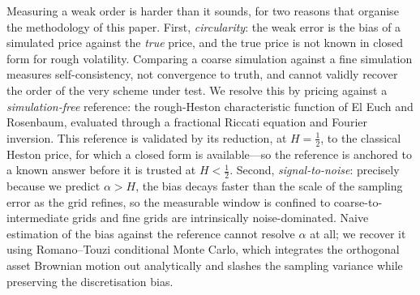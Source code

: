 \documentclass[11pt]{article}
\theoremstyle{plain}
\theoremstyle{definition}
\begin{document}
Measuring a weak order is harder than it sounds, for two reasons that organise the
methodology of this paper. First, \emph{circularity}: the weak error is the bias of
a simulated price against the \emph{true} price, and the true price is not known in
closed form for rough volatility. Comparing a coarse simulation against a fine
simulation measures self-consistency, not convergence to truth, and cannot validly
recover the order of the very scheme under test. We resolve this by pricing against
a \emph{simulation-free} reference: the rough-Heston characteristic function of El
Euch and Rosenbaum, evaluated through a fractional Riccati equation and Fourier
inversion. This reference is validated by its reduction, at $H=\tfrac12$, to the
classical Heston price, for which a closed form is available---so the reference is
anchored to a known answer before it is trusted at $H<\tfrac12$. Second,
\emph{signal-to-noise}: precisely because we predict $\alpha > H$, the bias decays
faster than the scale of the sampling error as the grid refines, so the measurable
window is confined to coarse-to-intermediate grids and fine grids are intrinsically
noise-dominated. Naive estimation of the bias against the reference cannot resolve
$\alpha$ at all; we recover it using Romano--Touzi conditional Monte Carlo, which
integrates the orthogonal asset Brownian motion out analytically and slashes the
sampling variance while preserving the discretisation bias.
\end{document}
